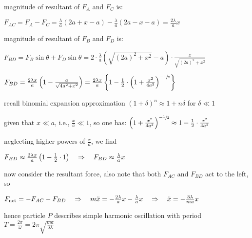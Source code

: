 magnitude of resultant of $F_A$ and $F_C$ is:

{
	
	\centering
	
	$F_{AC} = F_A - F_C = \frac{\lambda}{a}(2a+x-a) - \frac{\lambda}{a}(2a-x-a) = \frac{2\lambda}{a}x$
	
}

magnitude of resultant of $F_B$ and $F_D$ is:

{
	
	\centering
	
	$F_{BD} = F_B\sin\theta + F_D\sin\theta = 2\cdot\frac{\lambda}{a}\left(\sqrt{(2a)^2+x^2} - a\right)\cdot \frac{x}{\sqrt{(2a)^2+x^2}}$
	
	\vspace*{0.1\baselineskip}
	
	$F_{BD} = \frac{2\lambda x}{a} \left(1 - \frac{a}{\sqrt{4a^2+x^2}}\right) =  \frac{2\lambda x}{a} \left\{1 - \frac{1}{2} \cdot \left(1 + \frac{x^2}{4a^2}\right)^{-\sfrac{1}{2}} \right\} $
	
}

recall binomial expansion approximation $(1+\delta)^n \approx 1 + n\delta$ for $\delta \ll 1$

given that $x \ll a$, i.e., $\frac{x}{a} \ll 1$, so one has: $\left(1 + \frac{x^2}{4a^2}\right)^{-\sfrac{1}{2}} \approx 1 -\frac{1}{2}\cdot \frac{x^2}{4a^2} $

neglecting higher powers of $\frac{x}{a}$, we find

{
	
	\centering
	
	$F_{BD} \approx \frac{2\lambda x}{a} \left(1 - \frac{1}{2} \cdot 1\right)  \quad \Rightarrow \quad F_{BD} \approx \frac{\lambda}{a}x$
	
}

now consider the resultant force, also note that both $F_{AC}$ and $F_{BD}$ act to the left, so

{
	
	\centering
	
	$F_\text{net} = -F_{AC} - F_{BD} \quad \Rightarrow \quad m\ddot{x} = -\frac{2\lambda}{a}x - \frac{\lambda}{a}x \quad \Rightarrow \quad \ddot{x} = -\frac{3\lambda}{ma}x $
	
}

hence particle $P$ describes simple harmonic oscillation with period $T=\frac{2\pi}{\omega} = 2\pi\sqrt{\frac{ma}{3\lambda}}$ \eoe


 \label{ex-elabounce}

